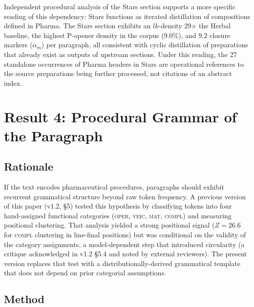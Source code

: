 \documentclass[11pt,a4paper]{article}
\begin{document}
Independent procedural analysis of the Stars section supports a more specific reading of this dependency: Stars functions as iterated distillation of compositions defined in Pharma. The Stars section exhibits an $lk$-density 29$\times$ the Herbal baseline, the highest P-opener density in the corpus (9.0\%), and 9.2 closure markers ($\alpha_m$) per paragraph, all consistent with cyclic distillation of preparations that already exist as outputs of upstream sections. Under this reading, the 27 standalone occurrences of Pharma headers in Stars are operational references to the source preparations being further processed, not citations of an abstract index.

\section{Result 4: Procedural Grammar of the Paragraph}\label{sec:r4}

\subsection{Rationale}

If the text encodes pharmaceutical procedures, paragraphs should exhibit recurrent grammatical structure beyond raw token frequency. A previous version of this paper (v1.2, \S5) tested this hypothesis by classifying tokens into four hand-assigned functional categories (\textsc{oper}, \textsc{veic}, \textsc{mat}, \textsc{compl}) and measuring positional clustering. That analysis yielded a strong positional signal ($Z = 26.6$ for \textsc{compl} clustering in line-final positions) but was conditional on the validity of the category assignments, a model-dependent step that introduced circularity (a critique acknowledged in v1.2 \S5.4 and noted by external reviewers). The present version replaces that test with a distributionally-derived grammatical template that does not depend on prior categorial assumptions.

\subsection{Method}
\end{document}
